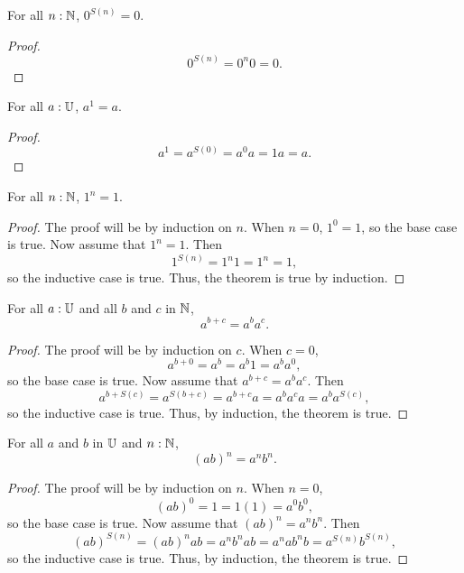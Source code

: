 \documentclass[../math.tex]{subfiles}
\begin{document}
\begin{theorem}
    For all $n : \mathbb{N}$, $0^{S(n)} = 0$.
\end{theorem}
\begin{proof}
    \[
        0^{S(n)} = 0^n0 = 0.
    \]
\end{proof}

\begin{theorem}
    For all $a : \mathbb{U}$, $a^1 = a$.
\end{theorem}
\begin{proof}
    \[
        a^1 = a^{S(0)} = a^0a = 1a = a.
    \]
\end{proof}

\begin{theorem}
    For all $n : \mathbb{N}$, $1^n = 1$.
\end{theorem}
\begin{proof}
    The proof will be by induction on $n$.  When $n = 0$, $1^0 = 1$, so the base
    case is true.  Now assume that $1^n = 1$.  Then
    \[
        1^{S(n)} = 1^n1 = 1^n = 1,
    \]
    so the inductive case is true.  Thus, the theorem is true by induction.
\end{proof}

\begin{theorem}
    For all $a : \mathbb{U}$ and all $b$ and $c$ in $\mathbb{N}$,
    \[
        a^{b + c} = a^b a^c.
    \]
\end{theorem}
\begin{proof}
    The proof will be by induction on $c$.  When $c = 0$,
    \[
        a^{b + 0} = a^b = a^b1 = a^ba^0,
    \]
    so the base case is true.  Now assume that $a^{b + c} = a^b a^c$.  Then
    \[
        a^{b + S(c)} = a^{S(b + c)} = a^{b + c}a = a^b a^c a = a^b a^{S(c)},
    \]
    so the inductive case is true.  Thus, by induction, the theorem is true.
\end{proof}

\begin{theorem}
    For all $a$ and $b$ in $\mathbb{U}$ and $n : \mathbb{N}$,
    \[
        (ab)^n = a^nb^n.
    \]
\end{theorem}
\begin{proof}
    The proof will be by induction on $n$.  When $n = 0$,
    \[
        (ab)^0 = 1 = 1(1) = a^0b^0,
    \]
    so the base case is true.  Now assume that $(ab)^n = a^nb^n$.  Then
    \[
        (ab)^{S(n)} = (ab)^n ab = a^n b^n a b = a^n a b^n b = a^{S(n)} b^{S(n)},
    \]
    so the inductive case is true.  Thus, by induction, the theorem is true.
\end{proof}
\end{document}
